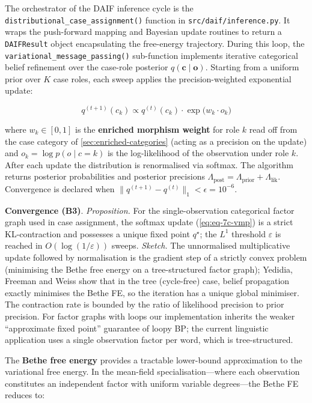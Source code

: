 \documentclass[
]{article}
\begin{document}
The orchestrator of the DAIF inference cycle is the
\texttt{distributional\_case\_assignment()} function in
\texttt{src/daif/inference.py}. It wraps the push-forward mapping and
Bayesian update routines to return a \texttt{DAIFResult} object
encapsulating the free-energy trajectory. During this loop, the
\texttt{variational\_message\_passing()} sub-function implements
iterative categorical belief refinement over the case-role posterior
\(q(\mathbf{c} \mid \mathbf{o})\). Starting from a uniform prior over
\(K\) case roles, each sweep applies the precision-weighted exponential
update:

\begin{equation}
q^{(t+1)}(c_k) \propto q^{(t)}(c_k) \cdot \exp\!\bigl(w_k \cdot o_k\bigr)
\label{eq:eq-7c-vmp}
\end{equation}

where \(w_k \in [0,1]\) is the \textbf{enriched morphism weight} for
role \(k\) read off from the case category of
\autoref{sec:enriched-categories} (acting as a precision on the update)
and \(o_k = \log p(o \mid c = k)\) is the log-likelihood of the
observation under role \(k\). After each update the distribution is
renormalised via softmax. The algorithm returns posterior probabilities
and posterior precisions
\(\Lambda_{\text{post}} = \Lambda_{\text{prior}} + \Lambda_{\text{lik}}\).
Convergence is declared when
\(\|q^{(t+1)} - q^{(t)}\|_1 < \epsilon = 10^{-6}\).

\textbf{Convergence (B3)}. \emph{Proposition.} For the
single-observation categorical factor graph used in case assignment, the
softmax update (\autoref{eq:eq-7c-vmp}) is a strict KL-contraction and
possesses a unique fixed point \(q^\star\); the \(L^1\) threshold
\(\varepsilon\) is reached in \(O(\log(1/\varepsilon))\) sweeps.
\emph{Sketch.} The unnormalised multiplicative update followed by
normalisation is the gradient step of a strictly convex problem
(minimising the Bethe free energy on a tree-structured factor graph);
Yedidia, Freeman and Weiss
\citeyearpar[§III--IV]{yedidia2005constructing} show that in the tree
(cycle-free) case, belief propagation exactly minimises the Bethe FE, so
the iteration has a unique global minimiser. The contraction rate is
bounded by the ratio of likelihood precision to prior precision. For
factor graphs with loops our implementation inherits the weaker
``approximate fixed point'' guarantee of loopy BP; the current
linguistic application uses a single observation factor per word, which
is tree-structured.

The \textbf{Bethe free energy} provides a tractable lower-bound
approximation to the variational free energy. In the mean-field
specialisation---where each observation constitutes an independent
factor with uniform variable degrees---the Bethe FE reduces to:
\end{document}
